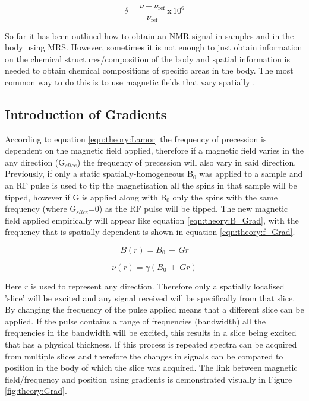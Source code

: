 \begin{equation}
    \delta = \frac{\nu - \nu_{\textrm{ref}}}{\nu_\textrm{ref}} \, \textrm{x} \, 10^6
    \label{eqn:theory:chemshift}
\end{equation}

So far it has been outlined how to obtain an \ac{NMR} signal in samples and in the body using MRS. However, sometimes it is not enough to just obtain information on the chemical structures/composition of the body and spatial information is needed to obtain chemical compositions of specific areas in the body. The most common way to do this is to use magnetic fields that vary spatially \cite{Haacke2014MagneticDesign}. 

\subsection{Introduction of Gradients}

According to equation \ref{eqn:theory:Lamor} the frequency of precession is dependent on the magnetic field applied, therefore if a magnetic field varies in the any direction (G$_{slice}$) the frequency of precession will also vary in said direction. Previously, if only a static spatially-homogeneous B$_0$ was applied to a sample and an \ac{RF} pulse is used to tip the magnetisation all the spins in that sample will be tipped, however if G is applied along with B$_0$ only the spins with the same frequency (where G$_{slice}$=0) as the \ac{RF} pulse will be tipped. The new magnetic field applied empirically will appear like equation \ref{eqn:theory:B_Grad}, with the frequency that is spatially dependent is shown in equation \ref{eqn:theory:f_Grad}.

\begin{equation}
    B(r) = B_0 \, + \, Gr
    \label{eqn:theory:B_Grad}
\end{equation}

\begin{equation}
    \nu(r) = \gamma(B_0 \, + \, Gr)
    \label{eqn:theory:f_Grad}
\end{equation}

Here $r$ is used to represent any direction. Therefore only a spatially localised 'slice' will be excited and any signal received will be specifically from that slice. By changing the frequency of the pulse applied means that a different slice can be applied. If the pulse contains a range of frequencies (bandwidth) all the frequencies in the bandwidth will be excited, this results in a slice being excited that has a physical thickness. If this process is repeated spectra can be acquired from multiple slices and therefore the changes in signals can be compared to position in the body of which the slice was acquired. The link between magnetic field/frequency and position using gradients is demonstrated visually in Figure \ref{fig:theory:Grad}.

